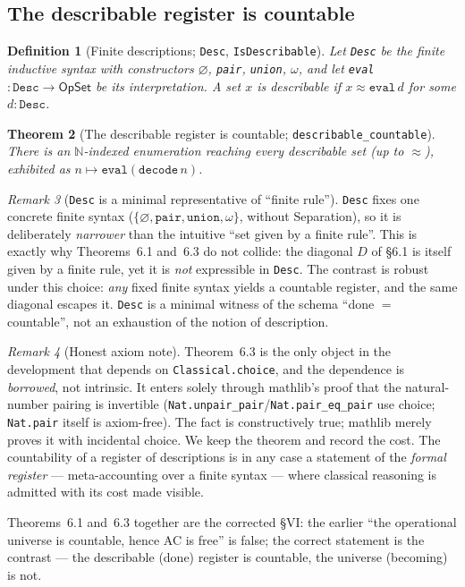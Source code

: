 \documentclass[11pt]{article}
\newtheorem{thm}{Theorem}[section]
\newtheorem{defn}[thm]{Definition}
\theoremstyle{remark}
\newtheorem{rem}[thm]{Remark}
\newcommand{\OpSet}{\textsf{OpSet}}
\newcommand{\eq}{\approx}
\newcommand{\N}{\mathbb{N}}
\begin{document}
\subsection{The describable register is countable}
\begin{defn}[Finite descriptions; \texttt{Desc}, \texttt{IsDescribable}]
Let \texttt{Desc} be the finite inductive syntax with constructors $\varnothing$, \texttt{pair},
\texttt{union}, $\omega$, and let \texttt{eval}$:\texttt{Desc}\to\OpSet$ be its interpretation. A set
$x$ is describable if $x\eq\texttt{eval}\,d$ for some $d:\texttt{Desc}$.
\end{defn}
\begin{thm}[The describable register is countable; \texttt{describable\_countable}]
There is an $\N$-indexed enumeration reaching every describable set (up to $\eq$), exhibited as
$n\mapsto\texttt{eval}(\texttt{decode}\,n)$.
\end{thm}
\begin{rem}[\texttt{Desc} is a minimal representative of ``finite rule'']
\texttt{Desc} fixes one concrete finite syntax ($\{\varnothing,\texttt{pair},\texttt{union},
\omega\}$, without Separation), so it is deliberately \emph{narrower} than the intuitive ``set given
by a finite rule''. This is exactly why Theorems~6.1 and~6.3 do not collide: the diagonal $D$ of
\S6.1 is itself given by a finite rule, yet it is \emph{not} expressible in \texttt{Desc}. The
contrast is robust under this choice: \emph{any} fixed finite syntax yields a countable register, and
the same diagonal escapes it. \texttt{Desc} is a minimal witness of the schema ``done $=$ countable'',
not an exhaustion of the notion of description.
\end{rem}
\begin{rem}[Honest axiom note]
Theorem~6.3 is the only object in the development that depends on \texttt{Classical.choice}, and the
dependence is \emph{borrowed}, not intrinsic. It enters solely through mathlib's proof that the
natural-number pairing is invertible (\texttt{Nat.unpair\_pair}/\texttt{Nat.pair\_eq\_pair} use
choice; \texttt{Nat.pair} itself is axiom-free). The fact is constructively true; mathlib merely
proves it with incidental choice. We keep the theorem and record the cost. The countability of a
register of descriptions is in any case a statement of the \emph{formal register} --- meta-accounting
over a finite syntax --- where classical reasoning is admitted with its cost made visible.
\end{rem}
Theorems~6.1 and~6.3 together are the corrected \S VI: the earlier ``the operational universe is
countable, hence AC is free'' is false; the correct statement is the contrast --- the describable
(done) register is countable, the universe (becoming) is not.
\end{document}
